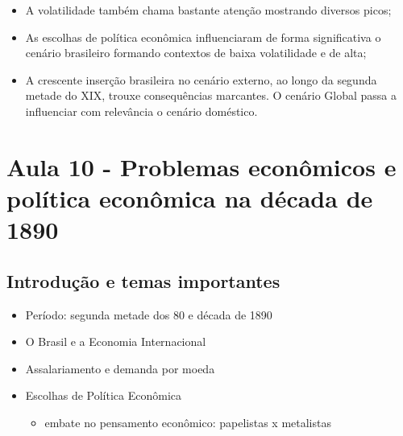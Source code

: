 \documentclass[a4paper,12pt]{article}[abntex2]
\begin{document}
\begin{itemize}
\begin{itemize}
    \item A volatilidade também chama bastante atenção mostrando diversos picos;
\end{itemize}
\begin{itemize}
    \item As escolhas de política econômica influenciaram de forma significativa o cenário brasileiro formando contextos de baixa volatilidade e de alta;
\end{itemize}
\begin{itemize}
    \item A crescente inserção brasileira no cenário externo, ao longo da segunda metade do XIX, trouxe consequências marcantes. O cenário Global passa a influenciar com relevância o cenário doméstico.
\end{itemize}
\end{itemize}
\newpage

\section{\textbf{Aula 10 - Problemas econômicos e política econômica na década de 1890}}
\subsection{\textbf{Introdução e temas importantes}}
\begin{itemize}
    \item Período: segunda metade dos 80 e década de 1890
    \item O Brasil e a Economia Internacional
    \item  Assalariamento e demanda por moeda
    \item Escolhas de Política Econômica
    \begin{itemize}
        \item embate no pensamento econômico: papelistas x metalistas
    \end{itemize}
\end{itemize}
\end{document}
